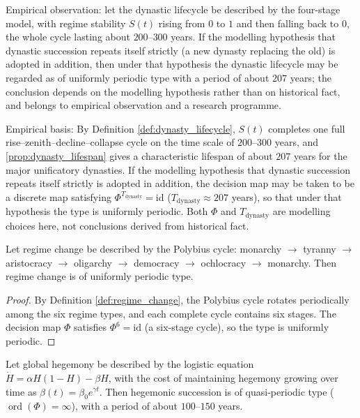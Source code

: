 \begin{remark}\label{lem:dynasty_periodic}
Empirical observation: let the dynastic lifecycle be described by the four-stage model, with regime stability $S(t)$ rising from $0$ to $1$ and then falling back to $0$, the whole cycle lasting about $200$--$300$ years. If the modelling hypothesis that dynastic succession repeats itself strictly (a new dynasty replacing the old) is adopted in addition, then under that hypothesis the dynastic lifecycle may be regarded as of uniformly periodic type with a period of about $207$ years; the conclusion depends on the modelling hypothesis rather than on historical fact, and belongs to empirical observation and a research programme.

Empirical basis:
By Definition \ref{def:dynasty_lifecycle}, $S(t)$ completes one full rise--zenith--decline--collapse cycle on the time scale of $200$--$300$ years, and \cref{prop:dynasty_lifespan} gives a characteristic lifespan of about $207$ years for the major unificatory dynasties. If the modelling hypothesis that dynastic succession repeats itself strictly is adopted in addition, the decision map may be taken to be a discrete map satisfying $\Phi^{T_{\text{dynasty}}}=\mathrm{id}$ ($T_{\text{dynasty}}\approx207$ years), so that under that hypothesis the type is uniformly periodic. Both $\Phi$ and $T_{\text{dynasty}}$ are modelling choices here, not conclusions derived from historical fact.
\end{remark}

\begin{lemma}\label{lem:regime_periodic}
Let regime change be described by the Polybius cycle: monarchy $\to$ tyranny $\to$ aristocracy $\to$ oligarchy $\to$ democracy $\to$ ochlocracy $\to$ monarchy. Then regime change is of uniformly periodic type.
\end{lemma}

\begin{proof}
By Definition \ref{def:regime_change}, the Polybius cycle rotates periodically among the six regime types, and each complete cycle contains six stages. The decision map $\Phi$ satisfies $\Phi^6=\mathrm{id}$ (a six-stage cycle), so the type is uniformly periodic.
\end{proof}

\begin{lemma}\label{lem:hegemony_periodic}
Let global hegemony be described by the logistic equation $\dot H=\alpha H(1-H)-\beta H$, with the cost of maintaining hegemony growing over time as $\beta(t)=\beta_0 e^{\gamma t}$. Then hegemonic succession is of quasi-periodic type ($\operatorname{ord}(\Phi)=\infty$), with a period of about $100$--$150$ years.
\end{lemma}

